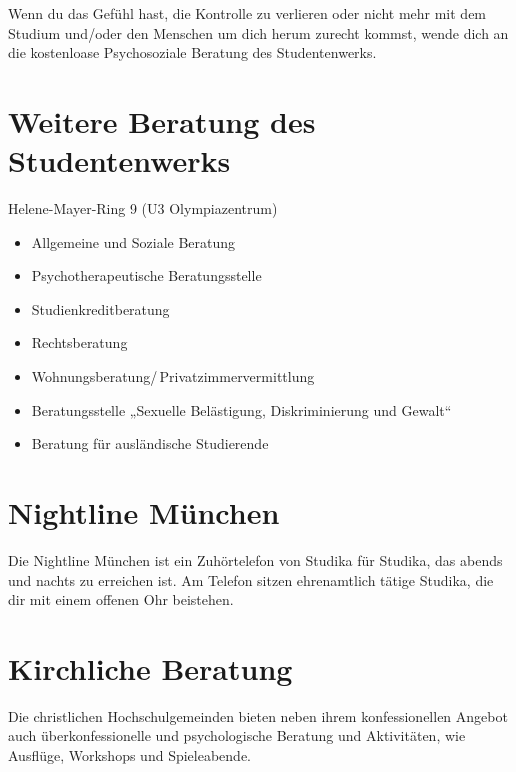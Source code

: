Wenn du das Gefühl hast, die Kontrolle zu verlieren oder nicht mehr mit
dem Studium und/oder den Menschen um dich herum zurecht kommst, wende dich an die kostenloase Psychosoziale Beratung des Studentenwerks.

\begin{urlList}
\end{urlList}


\section{Weitere Beratung des Studentenwerks}
Helene-Mayer-Ring 9 (U3 Olympiazentrum)

\begin{itemize}
	\item Allgemeine und Soziale Beratung
	\item Psychotherapeutische Beratungsstelle
	\item Studienkreditberatung
	\item Rechtsberatung
	\item Wohnungsberatung/\,Privatzimmervermittlung
	\item Beratungsstelle „Sexuelle Belästigung, Diskriminierung und Gewalt“
	\item Beratung für ausländische Studierende
\end{itemize}

\begin{urlList}
\end{urlList}


\section{Nightline München}

Die Nightline München ist ein Zuhörtelefon von Studika für Studika,
das abends und nachts zu erreichen ist. Am Telefon sitzen ehrenamtlich
tätige Studika, die dir mit einem offenen Ohr beistehen.

\begin{urlList}
\end{urlList}


\section{Kirchliche Beratung}
Die christlichen Hochschulgemeinden bieten neben ihrem konfessionellen Angebot auch überkonfessionelle und psychologische Beratung und Aktivitäten, wie Ausflüge, Workshops und Spieleabende.

\begin{urlList}
\end{urlList}
